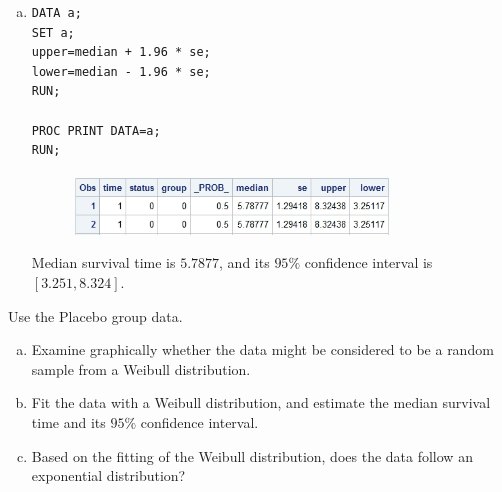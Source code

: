 \documentclass{elegantbook}
\begin{document}
\begin{solution}
\begin{enumerate}[(a)]
\begin{figure}[H]
        \end{figure}
        \item \begin{verbatim}
DATA a;
SET a;
upper=median + 1.96 * se;
lower=median - 1.96 * se;
RUN;

PROC PRINT DATA=a;
RUN;
        \end{verbatim}
        \begin{figure}[H]
            \centering
            \includegraphics[width=0.8\textwidth]{HW9_1c.png}
        \end{figure}
        Median survival time is $5.7877$, and its $95\%$ confidence interval is $[3.251, 8.324]$.
    \end{enumerate}
\end{solution}

\begin{exercise*}[2]
    Use the Placebo group data.
    \begin{enumerate}[(a)]
        \item Examine graphically whether the data might be considered to be a random sample from a Weibull distribution.
        \item Fit the data with a Weibull distribution, and estimate the median survival time and its $95\%$ confidence interval.
        \item Based on the fitting of the Weibull distribution, does the data follow an exponential distribution?
    \end{enumerate}
\end{exercise*}
\end{document}
